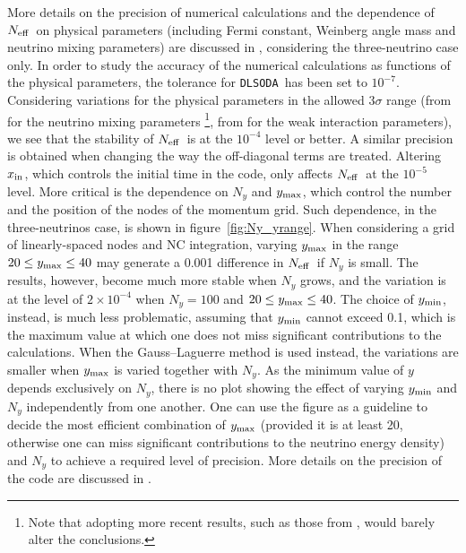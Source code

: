 \documentclass[notitlepage,nofootinbib,showpacs,preprintnumbers,amsmath,amssymb,superscriptaddress,prd,onecolumn]{revtex4-1}
\newcommand{\Neff}{\ensuremath{N_{\rm eff}}}
\newcommand{\dlsoda}{\texttt{DLSODA}}
\begin{document}
More details on the precision of numerical calculations and the dependence of \Neff\ on physical parameters
(including Fermi constant, Weinberg angle mass and neutrino mixing parameters)
are discussed in \cite{Bennett:2020zkv}, considering the three-neutrino case only.
In order to study the accuracy of the numerical calculations as functions of the physical parameters,
the tolerance for \dlsoda\ has been set to $10^{-7}$.
Considering variations for the physical parameters in the allowed $3\sigma$ range
(from \cite{deSalas:2017kay} for the neutrino mixing parameters%
\footnote{Note that adopting more recent results,
such as those from \cite{Capozzi:2020qhw,Esteban:2020cvm,deSalas:2020pgw},
would barely alter the conclusions.},
from \cite{Tanabashi:2018oca,Zyla:2020zbs} for the weak interaction parameters),
we see that the stability of \Neff\ is at the $10^{-4}$ level or better.
A similar precision is obtained when changing the way the off-diagonal terms are treated.
Altering $x_{\rm in}$, which controls the initial time in the code,
only affects \Neff\ at the $10^{-5}$ level.
More critical is the dependence on $N_y$ and $y_{\rm max}$,
which control the number and the position of the nodes of the momentum grid.
Such dependence, in the three-neutrinos case, is shown in figure~\ref{fig:Ny_yrange}.
When considering a grid of linearly-spaced nodes and NC integration,
varying $y_{\rm max}$ in the range $20\leq y_{\rm max}\leq 40$
may generate a 0.001 difference in \Neff\ if $N_y$ is small.
The results, however, become much more stable when $N_y$ grows,
and the variation is at the level of $2\times10^{-4}$
when $N_y=100$ and $20\leq y_{\rm max}\leq 40$.
The choice of $y_{\rm min}$, instead, is much less problematic,
assuming that $y_{\rm min}$ cannot exceed 0.1,
which is the maximum value at which one does not miss significant contributions to the calculations.
When the Gauss--Laguerre method is used instead, the variations are smaller when $y_{\rm max}$ is varied together with $N_y$.
As the minimum value of $y$ depends exclusively on $N_y$, there is no plot showing the effect of varying $y_{\rm min}$ and $N_y$ independently from one another.
One can use the figure as a guideline to decide the most efficient combination
of $y_{\rm max}$ (provided it is at least 20,
otherwise one can miss significant contributions to the neutrino energy density)
and $N_y$ to achieve a required level of precision.
More details on the precision of the code are discussed in \cite{Gariazzo:2019gyi,Bennett:2020zkv}.
\end{document}
